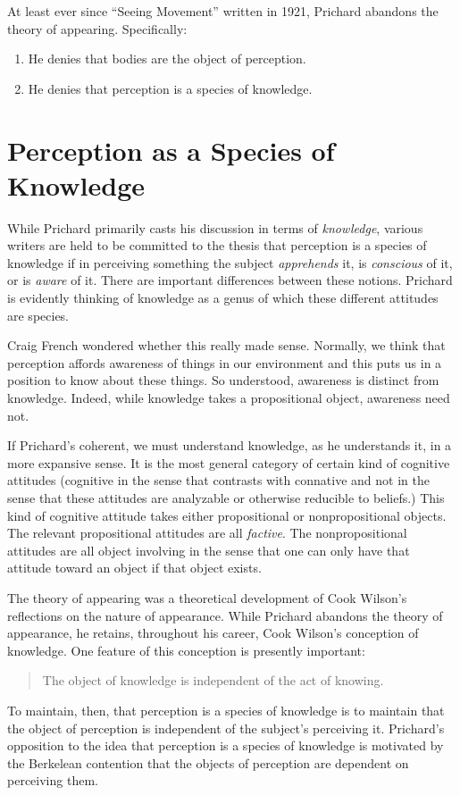 \documentclass[11pt]{article}
\begin{document}
At least ever since ``Seeing Movement'' written in 1921, Prichard abandons the theory of appearing. Specifically:
        \begin{enumerate}
            \item He denies that bodies are the object of perception.
            \item He denies that perception is a species of knowledge.
        \end{enumerate}

\section{Perception as a Species of Knowledge} %
\label{sec:perception_as_a_species_of_knowledge}
While Prichard primarily casts his discussion in terms of \emph{knowledge}, various writers are held to be committed to the thesis that perception is a species of knowledge if in perceiving something the subject \emph{apprehends} it, is \emph{conscious} of it, or is \emph{aware} of it. There are important differences between these notions. Prichard is evidently thinking of knowledge as a genus of which these different attitudes are species.

\begin{discussion}
    Craig French wondered whether this really made sense. Normally, we think that perception affords awareness of things in our environment and this puts us in a position to know about these things. So understood, awareness is distinct from knowledge. Indeed, while knowledge takes a propositional object, awareness need not. 
    
    If Prichard's coherent, we must understand knowledge, as he understands it, in a more expansive sense. It is the most general category of certain kind of cognitive attitudes (cognitive in the sense that contrasts with connative and not in the sense that these attitudes are analyzable or otherwise reducible to beliefs.) This kind of cognitive attitude takes either propositional or nonpropositional objects. The relevant propositional attitudes are all \emph{factive}. The nonpropositional attitudes are all object involving in the sense that one can only have that attitude toward an object if that object exists.
\end{discussion}

The theory of appearing was a theoretical development of Cook Wilson's reflections on the nature of appearance. While Prichard abandons the theory of appearance, he retains, throughout his career, Cook Wilson's conception of knowledge. One feature of this conception is presently important:
\begin{quote}
    The object of knowledge is independent of the act of knowing.
\end{quote}
To maintain, then, that perception is a species of knowledge is to maintain that the object of perception is independent of the subject's perceiving it. Prichard's opposition to the idea that perception is a species of knowledge is motivated by the Berkelean contention that the objects of perception are dependent on perceiving them.
\end{document}
